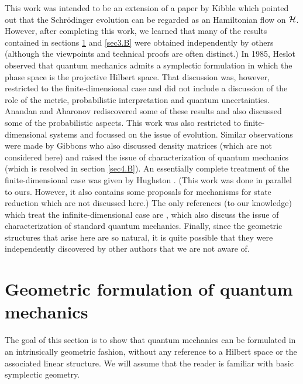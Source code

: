 This work was intended to be an extension of a paper by Kibble
{}\cite{kibble} which pointed out that the Schr\"odinger evolution can
be regarded as an Hamiltonian flow on ${\cal H}$. However, after completing
this work, we learned that many of the results contained in sections
\ref{sec2} and \ref{sec3.B} were obtained independently by others
(although the viewpoints and technical proofs are often distinct.)  In
1985, Heslot \cite{heslot} observed that quantum mechanics admits a
symplectic formulation in which the phase space is the projective
Hilbert space. That discussion was, however, restricted to the
finite-dimensional case and did not include a discussion of the role
of the metric, probabilistic interpretation and quantum uncertainties.
Anandan and Aharonov \cite{anandan} rediscovered some of these results
and also discussed some of the probabilistic aspects. This work was
also restricted to finite-dimensional systems and focussed on the
issue of evolution. Similar observations were made by Gibbons
\cite{gibbons} who also discussed density matrices (which are not
considered here) and raised the issue of characterization of quantum
mechanics (which is resolved in section \ref{sec4.B}). An essentially
complete treatment of the finite-dimensional case was given by
Hughston \cite{hughston}. (This work was done in parallel to
ours. However, it also contains some proposals for mechanisms for
state reduction \cite{hughston2} which are not discussed here.)  The
only references (to our knowledge) which treat the
infinite-dimensional case are \cite{italy1,italy2}, which also discuss
the issue of characterization of standard quantum mechanics. Finally,
since the geometric structures that arise here are so natural, it is
quite possible that they were independently discovered by other
authors that we are not aware of.


\section{Geometric formulation of quantum mechanics}\label{sec2}

The goal of this section is to show that quantum mechanics can be
formulated in an intrinsically geometric fashion, without any
reference to a Hilbert space or the associated linear structure.  We
will assume that the reader is familiar with basic symplectic
geometry.

